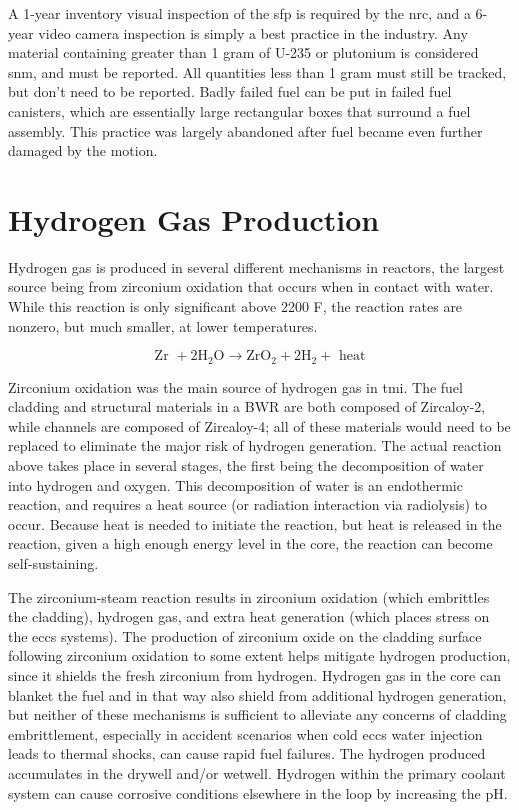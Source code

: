 \documentclass[10pt]{article}
\begin{document}
A 1-year inventory visual inspection of the \gls{sfp} is required by the \gls{nrc}, and a 6-year video camera inspection is simply a best practice in the industry. Any material containing greater than 1 gram of U-235 or plutonium is considered \gls{snm}, and must be reported. All quantities less than 1 gram must still be tracked, but don't need to be reported. Badly failed fuel can be put in failed fuel canisters, which are essentially large rectangular boxes that surround a fuel assembly. This practice was largely abandoned after fuel became even further damaged by the motion.





\section{Hydrogen Gas Production}

Hydrogen gas is produced in several different mechanisms in reactors, the largest source being from zirconium oxidation that occurs when in contact with water. While this reaction is only significant above 2200 F, the reaction rates are nonzero, but much smaller, at lower temperatures.

\begin{equation}
\textrm{Zr }+2\textrm{H}_2\textrm{O}\rightarrow \textrm{ZrO}_2+2\textrm{H}_2 +\textrm{ heat}
\end{equation}

Zirconium oxidation was the main source of hydrogen gas in \gls{tmi}. The fuel cladding and structural materials in a BWR are both composed of Zircaloy-2, while channels are composed of Zircaloy-4; all of these materials would need to be replaced to eliminate the major risk of hydrogen generation. The actual reaction above takes place in several stages, the first being the decomposition of water into hydrogen and oxygen. This decomposition of water is an endothermic reaction, and requires a heat source (or radiation interaction via radiolysis) to occur. Because heat is needed to initiate the reaction, but heat is released in the reaction, given a high enough energy level in the core, the reaction can become self-sustaining.

The zirconium-steam reaction results in zirconium oxidation (which embrittles the cladding), hydrogen gas, and extra heat generation (which places stress on the \gls{eccs} systems). The production of zirconium oxide on the cladding surface following zirconium oxidation to some extent helps mitigate hydrogen production, since it shields the fresh zirconium from hydrogen. Hydrogen gas in the core can blanket the fuel and in that way also shield from additional hydrogen generation, but neither of these mechanisms is sufficient to alleviate any concerns of cladding embrittlement, especially in accident scenarios when cold \gls{eccs} water injection leads to thermal shocks, can cause rapid fuel failures. The hydrogen produced accumulates in the drywell and/or wetwell. Hydrogen within the primary coolant system can cause corrosive conditions elsewhere in the loop by increasing the pH.  
\end{document}
